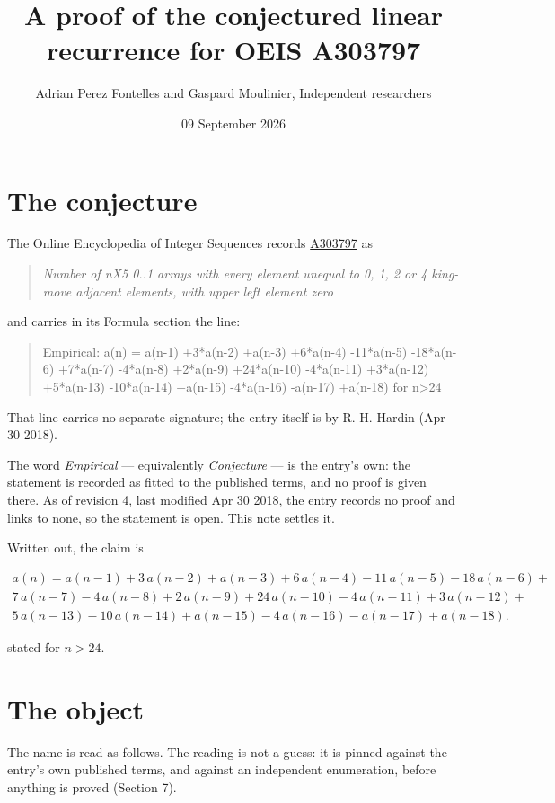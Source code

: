 \documentclass[11pt]{article}
\title{A proof of the conjectured linear recurrence for OEIS A303797}
\author{Adrian Perez Fontelles and Gaspard Moulinier, Independent researchers}
\date{09 September 2026}
\theoremstyle{definition}
\begin{document}
\maketitle
\section{The conjecture}

The Online Encyclopedia of Integer Sequences records \href{https://oeis.org/A303797}{A303797} as

\begin{quote}\itshape Number of nX5 0..1 arrays with every element unequal to 0, 1, 2 or 4 king-move adjacent elements, with upper left element zero\end{quote}

and carries in its Formula section the line:

\begin{quote}\ttfamily Empirical: a(n) = a(n-1) +3*a(n-2) +a(n-3) +6*a(n-4) -11*a(n-5) -18*a(n-6) +7*a(n-7) -4*a(n-8) +2*a(n-9) +24*a(n-10) -4*a(n-11) +3*a(n-12) +5*a(n-13) -10*a(n-14) +a(n-15) -4*a(n-16) -a(n-17) +a(n-18) for n>24\end{quote}

That line carries no separate signature; the entry itself is by R. H. Hardin (Apr 30 2018).

The word {\itshape Empirical} --- equivalently {\itshape Conjecture} --- is the entry's own: the statement is recorded as fitted to the published terms, and no proof is given there. As of revision 4, last modified Apr 30 2018, the entry records no proof and links to none, so the statement is open. This note settles it.

Written out, the claim is

\begin{multline*} a(n) = a(n-1) + 3\,a(n-2) + a(n-3) + 6\,a(n-4) - 11\,a(n-5) - 18\,a(n-6) + \\ 7\,a(n-7) - 4\,a(n-8) + 2\,a(n-9) + 24\,a(n-10) - 4\,a(n-11) + 3\,a(n-12) + \\ 5\,a(n-13) - 10\,a(n-14) + a(n-15) - 4\,a(n-16) - a(n-17) + a(n-18). \end{multline*}

stated for $n > 24$.

\section{The object}

The name is read as follows. The reading is not a guess: it is pinned against the entry's own published terms, and against an independent enumeration, before anything is proved (Section 7).
\end{document}
